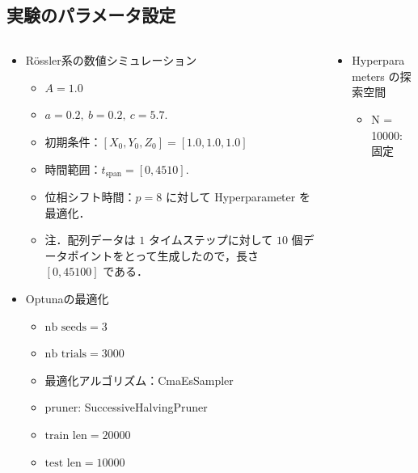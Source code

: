 \subsection{実験のパラメータ設定}

\begin{frame}
    \begin{columns}[T] %
        \begin{column}{.5\textwidth}
            \begin{itemize}
                \item Rössler系の数値シミュレーション\begin{itemize}
                    \item $A = 1.0$ 
                    \item $a = 0.2,\ b = 0.2,\ c = 5.7.$ 
                    \item 初期条件：$\left[ X_0, Y_0, Z_0 \right] = [1.0, 1.0, 1.0]$ 
                    \item 時間範囲：$t_\text{span} = [0, 4510].$ 
                    \item 位相シフト時間：$p = 8$ に対して Hyperparameter を最適化． 
                    \item 注．配列データは $1$ タイムステップに対して $10$ 個データポイントをとって生成したので，長さ $[0, 45100]$ である．
                \end{itemize}
                \item Optunaの最適化
                \begin{itemize}
                    \item $\text{nb seeds} = 3$
                    \item $\text{nb trials} = 3000$ 
                    \item 最適化アルゴリズム：CmaEsSampler
                    \item pruner: SuccessiveHalvingPruner
                    \item $\text{train len} = 20000$
                    \item $\text{test len} = 10000$
                \end{itemize}
            \end{itemize}
        \end{column}
        \begin{column}{.5\textwidth}
            \begin{itemize}
                \item Hyperparameters の探索空間\begin{itemize}
                    \item N = 10000: 固定


\end{itemize}
\end{itemize}
\end{column}
\end{columns}
\end{frame}
